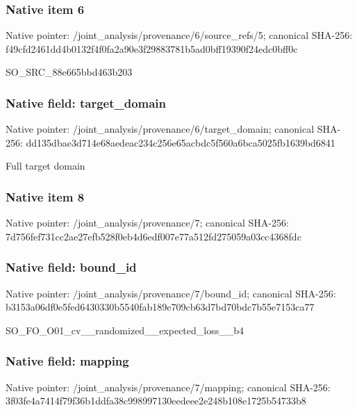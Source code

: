 \documentclass[10pt,a4paper]{article}
\begin{document}
\subsubsection{Native item 6}
Native pointer: /joint\_\allowbreak{}analysis/provenance/6/source\_\allowbreak{}refs/5; canonical SHA-256: f49cfd2461dd4b0132f4f0fa2a90e3f29883781b5ad0bff19390f24edc0bff0c

\begingroup\raggedright\sloppy SO\_\allowbreak{}SRC\_\allowbreak{}88e665bbd463b203\par\endgroup

\subsubsection{Native field: target\_\allowbreak{}domain}
Native pointer: /joint\_\allowbreak{}analysis/provenance/6/target\_\allowbreak{}domain; canonical SHA-256: dd135dbae3d714e68aedeac234c256e65acbdc5f560a6bca5025fb1639bd6841

\begingroup\raggedright\sloppy Full target domain\par\endgroup

\subsubsection{Native item 8}
Native pointer: /joint\_\allowbreak{}analysis/provenance/7; canonical SHA-256: 7d756fef731cc2ae27efb528f0eb4d6edf007e77a512fd275059a03cc4368fdc

\subsubsection{Native field: bound\_\allowbreak{}id}
Native pointer: /joint\_\allowbreak{}analysis/provenance/7/bound\_\allowbreak{}id; canonical SHA-256: b3153a06df0e5fed6430330b5540fab189e709cb63d7bd70bdc7b55e7153ca77

\begingroup\raggedright\sloppy SO\_\allowbreak{}FO\_\allowbreak{}O01\_\allowbreak{}cv\_\allowbreak{}\_\allowbreak{}randomized\_\allowbreak{}\_\allowbreak{}expected\_\allowbreak{}loss\_\allowbreak{}\_\allowbreak{}b4\par\endgroup

\subsubsection{Native field: mapping}
Native pointer: /joint\_\allowbreak{}analysis/provenance/7/mapping; canonical SHA-256: 3f03fe4a7414f79f36b1ddfa38c998997130eedeee2e248b108e1725b54733b8
\end{document}
